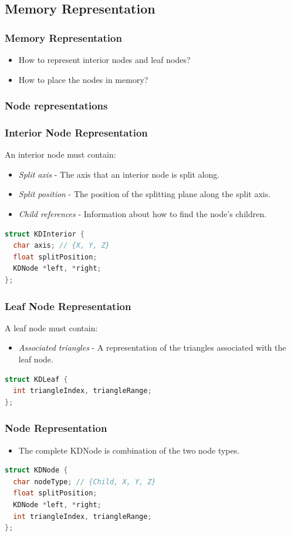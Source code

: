 \documentclass{beamer}
\begin{document}
\subsection{Memory Representation}
\begin{frame}
  \frametitle{Memory Representation}
  \begin{itemize}
  \item How to represent interior nodes and leaf nodes?
  \item How to place the nodes in memory?
  \end{itemize}
\end{frame}

\subsubsection{Node representations}
\begin{frame}[fragile]
  \frametitle{Interior Node Representation}
  An interior node must contain:
  \begin{itemize}
  \item \textit{Split axis} - The axis that an interior node is split
    along.
  \item \textit{Split position} - The position of the splitting plane
    along the split axis.
  \item \textit{Child references} - Information about how to find the
    node's children.
  \end{itemize}

  \begin{lstlisting}[language=C++]
struct KDInterior {
  char axis; // {X, Y, Z}
  float splitPosition;
  KDNode *left, *right;
};
  \end{lstlisting}
\end{frame}

\begin{frame}[fragile]
  \frametitle{Leaf Node Representation}
  A leaf node must contain:
  \begin{itemize}
    \item \textit{Associated triangles} - A representation of the triangles
      associated with the leaf node.
  \end{itemize}
  \begin{lstlisting}[language=C++]
struct KDLeaf {
  int triangleIndex, triangleRange;
};
  \end{lstlisting}
\end{frame}

\begin{frame}[fragile]
  \frametitle{Node Representation}
  \begin{itemize}
  \item The complete KDNode is combination of the two node types.
  \end{itemize}
  
  \begin{lstlisting}[language=C++]
struct KDNode {
  char nodeType; // {Child, X, Y, Z}
  float splitPosition;
  KDNode *left, *right;
  int triangleIndex, triangleRange;
};
  \end{lstlisting}
\end{frame}
\end{document}
